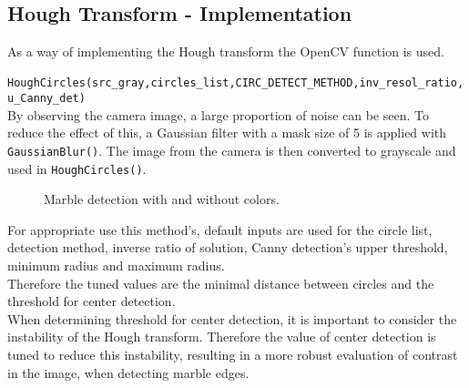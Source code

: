 \documentclass[../../../../main.tex]{subfiles}
\begin{document}
\subsection{Hough Transform - Implementation}
\label{sec:cv_hough_impl}
As a way of implementing the Hough transform the OpenCV function
is used.\\

\texttt{ HoughCircles(src\_gray,circles\_list,CIRC\_DETECT\_METHOD,inv\_resol\_ratio,u\_Canny\_det) }\\

By observing the camera image, a large proportion of noise can be seen. To reduce the effect of this, a Gaussian filter with a mask size of 5 is applied with
\texttt{GaussianBlur()}.
The image from the camera is then converted to grayscale and used in
\texttt{HoughCircles()}. \\

\begin{figure}[h]
  \begin{center}
  \end{center}
	\caption{Marble detection with and without colors.}
	\label{fig:hough_colors}
\end{figure}

For appropriate use this method's, default inputs are used for the circle list, detection method, inverse ratio of solution, Canny detection's upper threshold, minimum radius and maximum radius.\\

Therefore the tuned values are the minimal distance between circles and the threshold for center detection.\\

When determining threshold for center detection, it is important to consider the instability of the Hough transform. Therefore the value of center detection is tuned to reduce this instability, resulting in a more robust evaluation of contrast in the image, when detecting marble edges.\\

\end{document}
